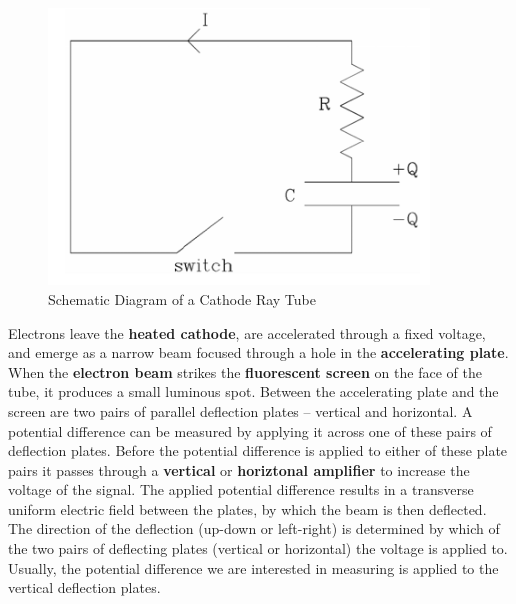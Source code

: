 \begin{figure}[h]
    \begin{center}
        \includegraphics[width=0.9\textwidth]{./Exp3/pic/image2.png}
    \end{center}
    \caption{Schematic Diagram of a Cathode Ray Tube}
    \label{fig:cathodtube}
\end{figure}


Electrons leave the \textbf{heated cathode}, are accelerated through a fixed voltage, and emerge as a narrow beam focused through a hole in the \textbf{accelerating plate}. When the \textbf{electron beam} strikes the \textbf{fluorescent screen} on the face of the tube, it produces a small luminous spot. Between the accelerating plate and the screen are two pairs of parallel deflection plates -- vertical and horizontal. A potential difference can be measured by applying it across one of these pairs of deflection plates. Before the potential difference is applied to either of these plate pairs it passes through a \textbf{vertical} or \textbf{horiztonal amplifier} to increase the voltage of the signal. The applied potential difference results in a transverse uniform electric field between the plates, by which the beam is then deflected. The direction of the deflection (up-down or left-right) is determined by which of the two pairs of deflecting plates (vertical or horizontal) the voltage is applied to. Usually, the potential difference we are interested in measuring is applied to the vertical deflection plates. \myskip


